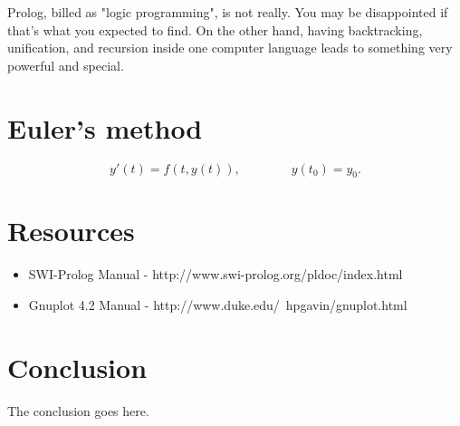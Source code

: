 \documentclass[journal]{IEEEtran}
\begin{document}
Prolog, billed as "logic programming", is not really. You may be disappointed if that's what you expected to find. On the other hand, having backtracking, unification, and recursion inside one computer language leads to something very powerful and special.\cite{merritt1992}


\section{Euler's method}

\begin{equation}
y'(t) = f(t,y(t)), \qquad \qquad y(t_0)=y_0.
\end{equation}

\section{Resources}
\begin{itemize}
\item SWI-Prolog Manual - http://www.swi-prolog.org/pldoc/index.html
\item Gnuplot 4.2 Manual - http://www.duke.edu/~hpgavin/gnuplot.html
\end{itemize}

\section{Conclusion}
The conclusion goes here.


\ifCLASSOPTIONcaptionsoff
  \newpage
\fi



\end{document}
